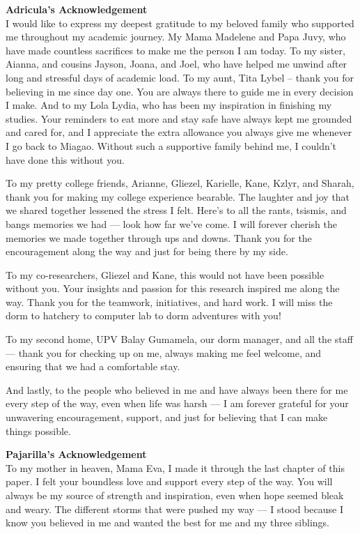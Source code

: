 \textbf{Adricula's Acknowledgement}\\
I would like to express my deepest gratitude to my beloved family who supported me throughout my academic journey. My Mama Madelene and Papa Juvy, who have made countless sacrifices to make me the person I am today. To my sister, Aianna, and cousins Jayson, Joana, and Joel, who have helped me unwind after long and stressful days of academic load. To my aunt, Tita Lybel – thank you for believing in me since day one. You are always there to guide me in every decision I make. And to my Lola Lydia, who has been my inspiration in finishing my studies. Your reminders to eat more and stay safe have always kept me grounded and cared for, and I appreciate the extra allowance you always give me whenever I go back to Miagao. Without such a supportive family behind me, I couldn’t have done this without you.

To my pretty college friends, Arianne, Gliezel, Karielle, Kane, Kzlyr, and Sharah, thank you for making my college experience bearable. The laughter and joy that we shared together lessened the stress I felt. Here’s to all the rants, tsismis, and bangs memories we had — look how far we’ve come. I will forever cherish the memories we made together through ups and downs. Thank you for the encouragement along the way and just for being there by my side.

To my co-researchers, Gliezel and Kane, this would not have been possible without you. Your insights and passion for this research inspired me along the way. Thank you for the teamwork, initiatives, and hard work. I will miss the dorm to hatchery to computer lab to dorm adventures with you!

To my second home, UPV Balay Gumamela, our dorm manager, and all the staff — thank you for checking up on me, always making me feel welcome, and ensuring that we had a comfortable stay.

And lastly, to the people who believed in me and have always been there for me every step of the way, even when life was harsh — I am forever grateful for your unwavering encouragement, support, and just for believing that I can make things possible.

\textbf{Pajarilla's Acknowledgement} \\

To my mother in heaven, Mama Eva, I made it through the last chapter of this paper. I felt your boundless love and support every step of the way. You will always be my source of strength and inspiration, even when hope seemed bleak and weary. The different storms that were pushed my way — I stood because I know you believed in me and wanted the best for me and my three siblings.

